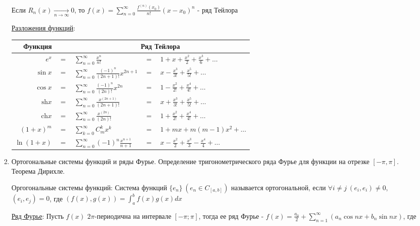 \documentclass[12pt]{article}
\begin{document}
\begin{enumerate}
    \Ths Если $R_n(x) \underset{n \to \infty}{\longrightarrow} 0$, то $f(x) = \sum_{n = 0}^\infty \frac{f^{(n)}(x_0)}{n!} (x - x_0)^n$ - ряд Тейлора

    \hyperlink{taylorsseriesoffunctions}{Разложения функций}:

    \begin{tabular}{rclcl}
        Функция & & \multicolumn{3}{c}{Ряд Тейлора} \\
        \hline
        $e^x$ & $=$ & $\sum_{n = 0}^\infty \frac{x^n}{n!}$ & $=$ & $1 + x + \frac{x^2}{2} + \frac{x^3}{6} + \dots$ \\
        \hline
        $\sin x$ & $=$ & $\sum_{n = 0}^\infty \frac{(-1)^n}{(2n + 1)!}x^{2n + 1}$ & $=$ & $x - \frac{x^3}{3!} + \frac{x^5}{5!} + \dots$ \\
        \hline
        $\cos x$ & $=$ & $\sum_{n = 0}^\infty \frac{(-1)^n}{(2n)!}x^{2n}$ & $=$ & $1 - \frac{x^2}{2!} + \frac{x^4}{4!} + \dots$ \\
        \hline
        $\mathrm{sh} x$ & $=$ & $\sum_{n = 0}^\infty \frac{x^{(2n + 1)}}{(2n + 1)!}$ & $=$ & $x + \frac{x^3}{3!} + \frac{x^5}{5!} + \dots$\\
        \hline
        $\mathrm{ch} x$ & $=$ & $\sum_{n = 0}^\infty \frac{x^{(2n)}}{(2n)!}$  & $=$ & $1 + \frac{x^2}{2!} + \frac{x^4}{4!} + \dots$\\
        \hline 
        $(1 + x)^m$ & $=$ & $\sum_{k = 0}^\infty C_m^k x^k$ & $=$ & $1 + mx + m(m - 1)x^2 + \dots$\\
        \hline
        $\ln(1 + x)$ & $=$ & $\sum_{n = 0}^\infty (-1)^n \frac{x^{n + 1}}{n + 1}$ & $=$ & $x - \frac{x^2}{2} + \frac{x^3}{3} - \frac{x^4}{4} + \dots$ \\
    \end{tabular}

    \item Ортогональные системы функций и ряды Фурье. Определение тригонометрического ряда
    Фурье для функции на отрезке $[-\pi, \pi]$. Теорема Дирихле.

    Оргогональные системы функций: 
    Система функций $\{e_n\} \ (e_n \in C_{[a, b]})$ называется ортогональной, 
    если $\forall i \neq j \ (e_i, e_i) \neq 0$, $(e_i, e_j) = 0$, где
    $(f(x), g(x)) = \int_{a}^{b} f(x) g(x) dx$

    \hyperlink{fouriersseries}{Ряд Фурье}: Пусть $f(x)$ $2\pi$-периодична на интервале $[-\pi;\pi]$, тогда ее ряд Фурье - $f(x) = \frac{a_0}{2} + \sum_{n = 1}^\infty (a_n \cos nx + b_n \sin nx)$, где 
    

\end{enumerate}
\end{document}
